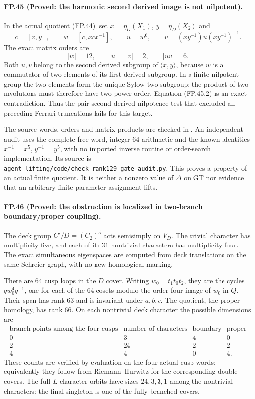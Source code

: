 \paragraph{FP.45 (Proved: the harmonic second derived image is not nilpotent).}
In the actual quotient (FP.44), set $x=\eta_D(X_1)$,
$y=\eta_D(X_2)$ and
\[
 c=[x,y],\qquad w=[c,xcx^{-1}],\qquad
 u=w^6,\qquad v=(xy^{-1})u(xy^{-1})^{-1}.
 \tag{FP.45.1}
\]
The exact matrix orders are
\[
                  |w|=12,\qquad |u|=|v|=2,
                              \qquad |uv|=6.
 \tag{FP.45.2}
\]
Both $u,v$ belong to the second derived subgroup of
$\langle x,y\rangle$, because $w$ is a commutator of two
elements of its first derived subgroup. In a finite nilpotent
group the two-elements form the unique Sylow two-subgroup;
the product of two involutions must therefore have two-power
order. Equation (FP.45.2) is an exact contradiction.
Thus the pair-second-derived nilpotence test that excluded
all preceding Ferrari truncations fails for this target.

The source words, orders and matrix products are checked in
. An independent audit
uses the complete free word, integer-64 arithmetic and the
known identities $x^{-1}=x^5$, $y^{-1}=y^5$, with no imported
inverse routine or order-search implementation. Its source
is \texttt{agent\_lifting/code/check\_rank129\_gate\_audit.py}.
This proves a property of an actual finite quotient. It is
neither a nonzero value of $\Delta$ on GT nor evidence that
an arbitrary finite parameter assignment lifts.

\paragraph{FP.46 (Proved: the obstruction is localized in two-branch boundary/proper coupling).}
The deck group $C'/D=(C_2)^5$ acts semisimply on $V_D$.
The trivial character has multiplicity five, and each of its
$31$ nontrivial characters has multiplicity four. The exact
simultaneous eigenspaces are computed from deck translations
on the same Schreier graph, with no new homological marking.

There are $64$ cusp loops in the $D$ cover. Writing
$w_0=t_1t_0t_2$, they are the cycles $q w_0^4q^{-1}$,
one for each of the $64$ cosets modulo the order-four image
of $w_0$ in $Q$. Their span has rank $63$ and is invariant
under $a,b,c$. The quotient, the proper homology, has rank
$66$. On each nontrivial deck character the possible
dimensions are
\[
\begin{array}{c|c|c|c}
 \text{branch points among the four cusps}&
 \text{number of characters}&\text{boundary}&\text{proper}\\\hline
 0&3&4&0\\
 2&24&2&2\\
 4&4&0&4.
\end{array}
 \tag{FP.46.1}
\]
These counts are verified by evaluation on the four actual
cusp words; equivalently they follow from Riemann--Hurwitz
for the corresponding double covers. The full $L$ character
orbits have sizes $24,3,3,1$ among the nontrivial characters:
the final singleton is one of the fully branched covers.

